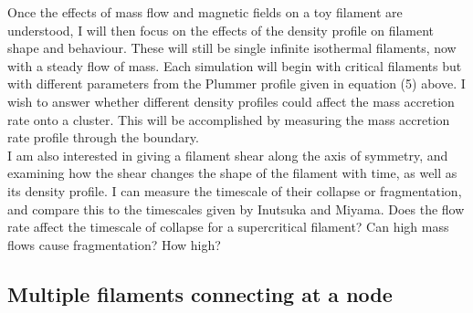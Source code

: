 \documentclass[a4paper,12pt]{article}
\begin{document}


Once the effects of mass flow and magnetic fields on a toy filament are understood, I will then focus on the effects of the density profile on filament shape and behaviour. These will still be single infinite isothermal filaments, now with a steady flow of mass. Each simulation will begin with critical filaments but with different parameters from the Plummer profile given in equation (5) above. I wish to answer whether different density profiles could affect the mass accretion rate onto a cluster. This will be accomplished by measuring the mass accretion rate profile through the boundary.\\

I am also interested in giving a filament shear along the axis of symmetry, and examining how the shear changes the shape of the filament with time, as well as its density profile. I can measure the timescale of their collapse or fragmentation, and compare this to the timescales given by Inutsuka and Miyama. Does the flow rate affect the timescale of collapse for a supercritical filament? Can high mass flows cause fragmentation? How high?

\subsection{Multiple filaments connecting at a node}
\end{document}
